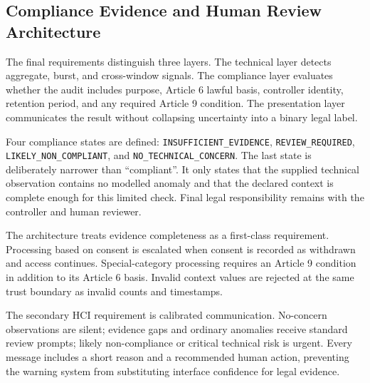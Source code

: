 
\subsection{Compliance Evidence and Human Review Architecture}

The final requirements distinguish three layers. The technical layer detects aggregate, burst, and cross-window signals. The compliance layer evaluates whether the audit includes purpose, Article 6 lawful basis, controller identity, retention period, and any required Article 9 condition. The presentation layer communicates the result without collapsing uncertainty into a binary legal label.

Four compliance states are defined: \texttt{INSUFFICIENT\_EVIDENCE}, \texttt{REVIEW\_REQUIRED}, \texttt{LIKELY\_NON\_COMPLIANT}, and \texttt{NO\_TECHNICAL\_CONCERN}. The last state is deliberately narrower than ``compliant''. It only states that the supplied technical observation contains no modelled anomaly and that the declared context is complete enough for this limited check. Final legal responsibility remains with the controller and human reviewer.

The architecture treats evidence completeness as a first-class requirement. Processing based on consent is escalated when consent is recorded as withdrawn and access continues. Special-category processing requires an Article 9 condition in addition to its Article 6 basis. Invalid context values are rejected at the same trust boundary as invalid counts and timestamps.

The secondary HCI requirement is calibrated communication. No-concern observations are silent; evidence gaps and ordinary anomalies receive standard review prompts; likely non-compliance or critical technical risk is urgent. Every message includes a short reason and a recommended human action, preventing the warning system from substituting interface confidence for legal evidence.
